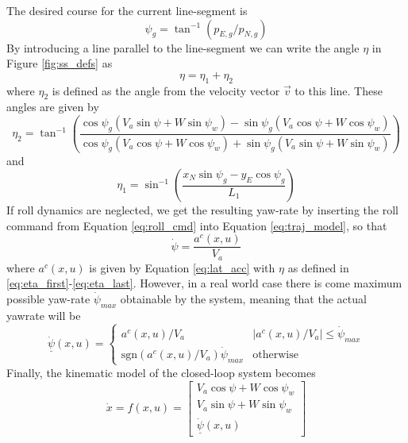 The desired course for the current line-segment is
\begin{equation}
    \psi_g=\tan^{-1}(p_{E,g}/p_{N,g})
\end{equation}
By introducing a line parallel to the line-segment we can write the angle $\eta$ in Figure \ref{fig:ss_defs} as
\begin{equation}\label{eq:eta_first}
    \eta=\eta_1+\eta_2
\end{equation}
where $\eta_2$ is defined as the angle from the velocity vector $\vec{v}$ to this line. 
These angles are given by 
\begin{equation}
    \eta_2=\tan^{-1}\left(\frac{\cos\psi_g(V_a\sin\psi + W\sin\psi_w) - \sin\psi_g(V_a\cos\psi + W\cos\psi_w)}{\cos\psi_g(V_a\cos\psi + W\cos\psi_w)+\sin\psi_g(V_a\sin\psi + W\sin\psi_w)}\right)
\end{equation}
and 
\begin{equation}\label{eq:eta_last}
    \eta_1=\sin^{-1}\left(\frac{x_N\sin\psi_g-y_E\cos\psi_g}{L_1}\right)
\end{equation}
If roll dynamics are neglected, we get the resulting yaw-rate by inserting the roll command from Equation \eqref{eq:roll_cmd} into Equation \eqref{eq:traj_model}, so that 
\begin{equation}
    \dot{\psi}=\frac{a^c(x, u)}{V_a}
\end{equation}
where $a^c(x, u)$ is given by Equation \eqref{eq:lat_acc} with $\eta$ as defined in \eqref{eq:eta_first}-\eqref{eq:eta_last}.
However, in a real world case there is come maximum possible yaw-rate $\dot{\psi}_{max}$ obtainable by the system, meaning that the actual yawrate will be 
\begin{equation}\label{eq:saturation}
    \underline{\dot{\psi}}(x, u)=\begin{cases}
        a^c(x, u)/V_a & |a^c(x, u)/V_a| \leq \dot{\psi}_{max} \\
        \text{sgn}(a^c(x, u)/V_a)\dot{\psi}_{max} & \text{otherwise}
    \end{cases}
\end{equation}
Finally, the kinematic model of the closed-loop system becomes
\begin{equation}\label{eq:closed_loop}
    \dot{x}=f(x,u)=
    \begin{bmatrix}
        V_a\cos\psi + W\cos\psi_w\\
        V_a\sin\psi + W\sin\psi_w\\
        \underline{\dot{\psi}}(x, u)
    \end{bmatrix}
\end{equation}

